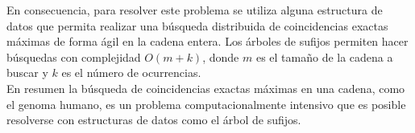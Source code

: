 \documentclass[12pt,a4paper]{article}
\begin{document}
En consecuencia, para resolver este problema se utiliza alguna estructura de datos que 
permita realizar una búsqueda distribuida de coincidencias exactas máximas de forma ágil 
en la cadena entera. Los árboles de sufijos permiten hacer 
búsquedas con complejidad $O(m+k)$, donde $m$ es el 
tamaño de la cadena a buscar y $k$ es el número de ocurrencias.\\
En resumen la búsqueda de coincidencias exactas máximas en una cadena, como el 
genoma humano, es un problema computacionalmente intensivo que es posible 
resolverse con estructuras de datos como el árbol de sufijos. 
\end{document}
